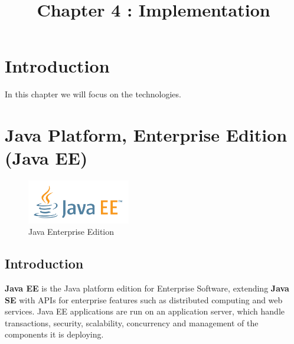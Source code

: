 \documentclass[12pt]{article}
\begin{document}
\listoffigures
	
\title{Chapter 4 : Implementation}
\maketitle
	\section{Introduction}
	
	In this chapter we will focus on the technologies. 
	\clearpage
	\newpage
	\section{Java Platform, Enterprise Edition (Java EE)}
		\begin{figure}[h]
		\centering
		\includegraphics[width=0.4\textwidth]{JAVAEE_logo.png}
		\caption{Java Enterprise Edition}
		
	    \end{figure}

\subsection{Introduction}
\textbf{Java EE} is the Java platform edition for Enterprise Software, extending \textbf{Java SE} with APIs for enterprise features such as distributed computing and web services. Java EE applications are run on an application server, which handle transactions, security, scalability, concurrency and management of the components it is deploying.
\\
\\
\end{document}
